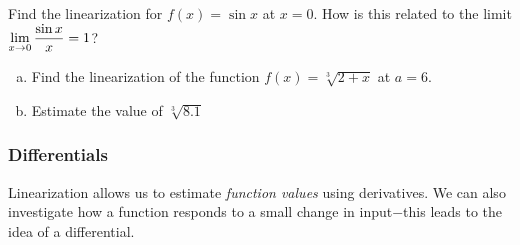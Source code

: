 \documentclass[notes]{subfiles}
\begin{document}
		\begin{ex}
			Find the linearization for $f(x) = \sin x$ at $x = 0$.  How is this related to the limit $\displaystyle \lim_{x\to 0} \dfrac{\sin x}{x} = 1$?
		\end{ex}
			
			
		\begin{ex}
			\begin{enumerate}[(a)]
				\item Find the linearization of the function $f(x) = \sqrt[3]{2 + x}$ at $a = 6$.
					
				\item Estimate the value of $\sqrt[3]{8.1}$
			\end{enumerate}
		\end{ex}
			\newpage
			
	\subsubsection*{Differentials}
		Linearization allows us to estimate \emph{function values} using derivatives.  We can also investigate how a function responds to a small change in input$-$this leads to the idea of a differential.
		
\end{document}
